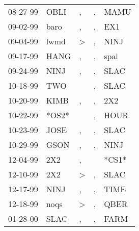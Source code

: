 \begin{supertabular}{p{0.07\textwidth}p{0.06\textwidth}p{0.02\textwidth}p{0.02\textwidth}p{0.06\textwidth}}
 08-27-99\textsuperscript{} &         OBLI\textsuperscript{} &             , &             , &           MAMU\textsuperscript{} \\
 09-02-99\textsuperscript{} &         baro\textsuperscript{} &             , &             , &            EX1\textsuperscript{} \\
 09-04-99\textsuperscript{} &         lwmd\textsuperscript{} &  \textgreater &             , &           NINJ\textsuperscript{} \\
 09-17-99\textsuperscript{} &         HANG\textsuperscript{} &             , &             , &           spai\textsuperscript{} \\
 09-24-99\textsuperscript{} &         NINJ\textsuperscript{} &             , &             , &           SLAC\textsuperscript{} \\
 10-18-99\textsuperscript{} &          TWO\textsuperscript{} &               &             , &           SLAC\textsuperscript{} \\
 10-20-99\textsuperscript{} &         KIMB\textsuperscript{} &             , &             , &            2X2\textsuperscript{} \\
 10-22-99\textsuperscript{} &                          *OS2* &               &             , &           HOUR\textsuperscript{} \\
 10-23-99\textsuperscript{} &         JOSE\textsuperscript{} &             , &             , &           SLAC\textsuperscript{} \\
 10-29-99\textsuperscript{} &         GSON\textsuperscript{} &             , &             , &           NINJ\textsuperscript{} \\
 12-04-99\textsuperscript{} &          2X2\textsuperscript{} &             , &               &                            *CS1* \\
 12-10-99\textsuperscript{} &          2X2\textsuperscript{} &  \textgreater &             , &           SLAC\textsuperscript{} \\
 12-17-99\textsuperscript{} &         NINJ\textsuperscript{} &             , &             , &           TIME\textsuperscript{} \\
 12-18-99\textsuperscript{} &         noqs\textsuperscript{} &  \textgreater &             , &           QBER\textsuperscript{} \\
 01-28-00\textsuperscript{} &         SLAC\textsuperscript{} &             , &             , &           FARM\textsuperscript{} \\

\end{supertabular}

